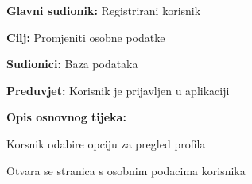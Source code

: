 				\noindent {}
					\begin{packed_item}
	
						\item \textbf{Glavni sudionik: }Registrirani korisnik
						\item  \textbf{Cilj:} Promjeniti osobne podatke
						\item  \textbf{Sudionici:} Baza podataka
						\item  \textbf{Preduvjet:} Korisnik je prijavljen u aplikaciji
						\item  \textbf{Opis osnovnog tijeka:}
						
						\item[] \begin{packed_enum}
	
							\item Korsnik odabire opciju za pregled profila
							\item Otvara se stranica s osobnim podacima korisnika

						\end{packed_enum}						
					\end{packed_item}
					
